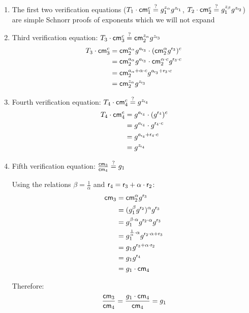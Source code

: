 \begin{enumerate}
    \item The first two verification equations ($T_1 \cdot \mathsf{cm}_1^c \stackrel{?}{=} g_1^{z_\alpha} g^{z_{\mathsf{r}_1}}$, $T_2 \cdot \mathsf{cm}_2^c \stackrel{?}{=} g_1^{z_\beta} g^{z_{\mathsf{r}_2}}$) are simple Schnorr proofs of exponents which we will not expand 
        
    \item Third verification equation: $T_3 \cdot \mathsf{cm}_3^c \stackrel{?}{=} \mathsf{cm}_2^{z_\alpha} g^{z_{\mathsf{r}_3}}$
    \begin{align*}
        T_3 \cdot \mathsf{cm}_3^c &= \mathsf{cm}_2^{a_\alpha} g^{a_{\mathsf{r}_3}} \cdot (\mathsf{cm}_2^\alpha g^{\mathsf{r}_3})^c \\
        &= \mathsf{cm}_2^{a_\alpha} g^{a_{\mathsf{r}_3}} \cdot \mathsf{cm}_2^{\alpha \cdot c} g^{\mathsf{r}_3 \cdot c} \\
        &= \mathsf{cm}_2^{a_\alpha + \alpha \cdot c} g^{a_{\mathsf{r}_3} + \mathsf{r}_3 \cdot c} \\
        &= \mathsf{cm}_2^{z_\alpha} g^{z_{\mathsf{r}_3}}
    \end{align*}
    
    \item Fourth verification equation: $T_4 \cdot \mathsf{cm}_4^c \stackrel{?}{=} g^{z_{\mathsf{r}_4}}$
    \begin{align*}
        T_4 \cdot \mathsf{cm}_4^c &= g^{a_{\mathsf{r}_4}} \cdot (g^{\mathsf{r}_4})^c \\
        &= g^{a_{\mathsf{r}_4}} \cdot g^{\mathsf{r}_4 \cdot c} \\
        &= g^{a_{\mathsf{r}_4} + \mathsf{r}_4 \cdot c} \\
        &= g^{z_{\mathsf{r}_4}}
    \end{align*}
    
    \item Fifth verification equation: $\frac{\mathsf{cm}_3}{\mathsf{cm}_4} \stackrel{?}{=} g_1$
    
    Using the relations $\beta = \frac{1}{\alpha}$ and $\mathsf{r}_4 = \mathsf{r}_3 + \alpha \cdot \mathsf{r}_2$:
    \begin{align*}
        \mathsf{cm}_3 &= \mathsf{cm}_2^\alpha g^{\mathsf{r}_3} \\
        &= (g_1^\beta g^{\mathsf{r}_2})^\alpha g^{\mathsf{r}_3} \\
        &= g_1^{\beta \cdot \alpha} g^{\mathsf{r}_2 \cdot \alpha} g^{\mathsf{r}_3} \\
        &= g_1^{\frac{1}{\alpha} \cdot \alpha} g^{\mathsf{r}_2 \cdot \alpha + \mathsf{r}_3} \\
        &= g_1 g^{\mathsf{r}_3 + \alpha \cdot \mathsf{r}_2} \\
        &= g_1 g^{\mathsf{r}_4} \\
        &= g_1 \cdot \mathsf{cm}_4
    \end{align*}
    
    Therefore:
    \begin{align*}
        \frac{\mathsf{cm}_3}{\mathsf{cm}_4} = \frac{g_1 \cdot \mathsf{cm}_4}{\mathsf{cm}_4} = g_1
    \end{align*}
\end{enumerate}

